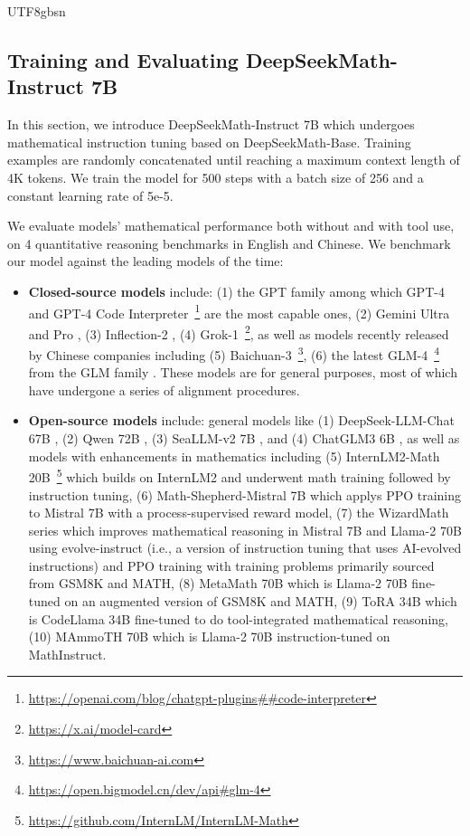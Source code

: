 \documentclass[11pt, a4paper, logo, copyright, nonumbering]{deepseek}
\newcommand{\spmath}{DeepSeekMath}
\begin{document}
\begin{CJK*}{UTF8}{gbsn}
\subsection{Training and Evaluating \spmath-Instruct 7B}

In this section, we introduce \spmath-Instruct 7B which undergoes mathematical instruction tuning based on \spmath-Base.
Training examples are randomly concatenated until reaching a maximum context length of 4K tokens.
We train the model for 500 steps with a batch size of 256 and a constant learning rate of 5e-5.

We evaluate models' mathematical performance both without and with tool use, on 4 quantitative reasoning benchmarks in English and Chinese.
We benchmark our model against the leading models of the time:
\begin{itemize}[topsep=0pt]
    \item \textbf{Closed-source models} include:
    (1) the GPT family among which GPT-4 \citep{gpt4} and GPT-4 Code Interpreter~\footnote{\url{https://openai.com/blog/chatgpt-plugins\#\#code-interpreter}} are the most capable ones,
    (2) Gemini Ultra and Pro \citep{gemini},
    (3) Inflection-2 \citep{inflection-2},
    (4) Grok-1~\footnote{\url{https://x.ai/model-card}},
    as well as models recently released by Chinese companies including
    (5) Baichuan-3~\footnote{\url{https://www.baichuan-ai.com}},
    (6) the latest GLM-4~\footnote{\url{https://open.bigmodel.cn/dev/api\#glm-4}}
    from the GLM family \citep{glm}.
    These models are for general purposes, most of which have undergone a series of alignment procedures.
    \item \textbf{Open-source models} include:
    general models like (1) DeepSeek-LLM-Chat 67B \citep{deepseek-llm}, (2) Qwen 72B \citep{qwen}, (3) SeaLLM-v2 7B \citep{seallm}, and (4) ChatGLM3 6B \citep{chatglm3},
    as well as models with enhancements in mathematics including
    (5) InternLM2-Math 20B~\footnote{\url{https://github.com/InternLM/InternLM-Math}} which builds on InternLM2 and underwent math training followed by instruction tuning,
    (6) Math-Shepherd-Mistral 7B which applys PPO training \citep{schulman2017proximal} to Mistral 7B \citep{mistral} with a process-supervised reward model,
    (7) the WizardMath series \citep{wizardmath} which improves mathematical reasoning in Mistral 7B and Llama-2 70B \citep{llama2} using evolve-instruct (i.e., a version of instruction tuning that uses AI-evolved instructions) and PPO training with training problems primarily sourced from GSM8K and MATH,
    (8) MetaMath 70B \citep{metamath} which is Llama-2 70B fine-tuned on an augmented version of GSM8K and MATH,
    (9) ToRA 34B \cite{tora} which is CodeLlama 34B fine-tuned to do tool-integrated mathematical reasoning,
    (10) MAmmoTH 70B \citep{MathInstruct} which is Llama-2 70B instruction-tuned on MathInstruct.
\end{itemize}


\end{CJK*}
\end{document}
